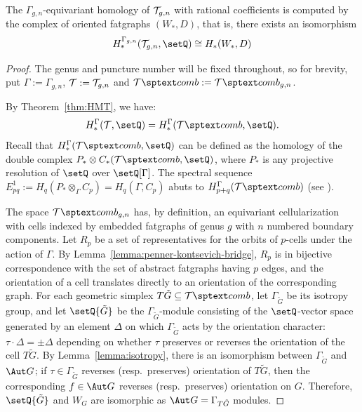 \begin{theorem}\label{thm:fatgraph-homology}
  The $\Gamma_{g,n}$-equivariant homology of $\mathcal{T}_{g,n}$ with rational
  coefficients is computed by the complex of oriented fatgraphs
  $(W_*, D)$, that is, there exists an isomorphism
  \begin{equation*}
    H^{\Gamma_{g,n}}_*(\T_{g,n}, \setQ) \cong H_*(W_*, D)
  \end{equation*}
\end{theorem}
\begin{proof}
  The genus and puncture number will be fixed throughout, so for
  brevity, put $\Gamma := \Gamma_{g,n}$, $\mathcal{T} := \mathcal{T}_{g,n}$ and $\Tcomb :=
  \Tcomb_{g,n}$.  

  By Theorem~\ref{thm:HMT}, we have:
  \begin{equation*}
    H^\Gamma_*(\T, \setQ) = H^\Gamma_*(\Tcomb, \setQ). 
  \end{equation*}
  Recall that $H^\Gamma_*(\Tcomb, \setQ)$ can be defined as the homology of the
  double complex $P_* \otimes C_*(\Tcomb, \setQ)$, where $P_*$ is any projective
  resolution of $\setQ$ over $\setQ[\Gamma]$.  The spectral sequence $E^1_{pq} :=
  H_q(P_* \otimes_\Gamma C_p) = H_q(\Gamma, C_p)$ abuts to $H^\Gamma_{p+q}(\Tcomb)$ (see
  \cite[VII.5 and VII.7]{brown}).

  The space $\Tcomb_{g,n}$ has, by definition, an equivariant
  cellularization with cells indexed by embedded fatgraphs of
  genus $g$ with $n$ numbered boundary components.  Let $R_p$ be a set
  of representatives for the orbits of $p$-cells under the action of
  $\Gamma$.  By Lemma~\ref{lemma:penner-kontsevich-bridge}, $R_p$ is in
  bijective correspondence with the set of abstract fatgraphs
  having $p$ edges, and the orientation of a cell translates directly
  to an orientation of the corresponding graph.  For each geometric
  simplex $T{\tilde G} \subseteq \Tcomb$, let $\Gamma_{\tilde G}$ be its
  isotropy group, and let $\setQ{\tilde G}$ be the $\Gamma_{\tilde
      G}$-module consisting of the $\setQ$-vector space generated by an
  element $\Delta$ on which $\Gamma_{\tilde G}$ acts by the orientation
  character: $\tau \cdot \Delta = \pm \Delta$ depending on whether $\tau$ preserves or
  reverses the orientation of the cell $T{\tilde G}$.  By
  Lemma~\ref{lemma:isotropy}, there is an isomorphism between $\Gamma_{\tilde
      G}$ and $\Aut G$; if $\tau \in \Gamma_{\tilde G}$ reverses
  (resp.~preserves) orientation of $T{\tilde G}$, then the
  corresponding $f \in \Aut G$ reverses (resp.~preserves) orientation on
  $G$.  Therefore, $\setQ{\tilde G}$ and $W_G$ are isomorphic as $\Aut G =
  \Gamma_{T{\tilde G}}$ modules.


\end{proof}
